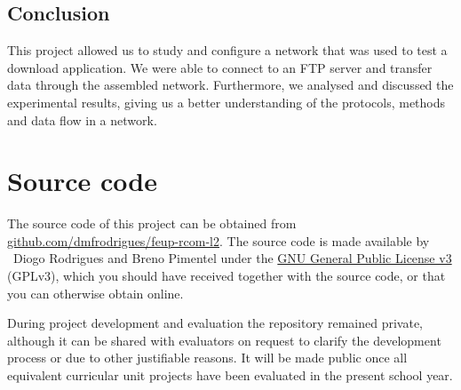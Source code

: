 \documentclass[a4paper, 11pt]{report}
\begin{document}
\section*{Conclusion} \label{sec:Conclusion}

This project allowed us to study and configure a network that was used to test a download application.
We were able to connect to an FTP server and transfer data through the assembled network.
Furthermore, we analysed and discussed the experimental results, giving us a better understanding of the protocols, methods and data flow in a network.




\appendix
\appendixpage
\addappheadtotoc
\chapter{Source code}

The source code of this project can be obtained from \href{https://github.com/dmfrodrigues/feup-rcom-l2}{github.com/dmfrodrigues/feup-rcom-l2}.
The source code is made available by \textcopyright~Diogo Rodrigues and Breno Pimentel under the \href{https://www.gnu.org/licenses/gpl-3.0.en.html}{GNU General Public License v3} (GPLv3), which you should have received together with the source code, or that you can otherwise obtain online.

During project development and evaluation the repository remained private, although it can be shared with evaluators on request to clarify the development process or due to other justifiable reasons.
It will be made public once all equivalent curricular unit projects have been evaluated in the present school year.

\fancyhfoffset{0pt}









\end{document}
